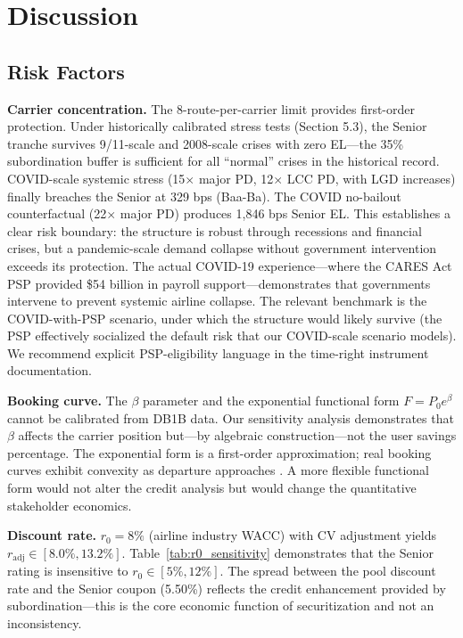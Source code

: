 \documentclass[12pt,a4paper]{article}
\begin{document}
\section{Discussion}

\subsection{Risk Factors}

\textbf{Carrier concentration.} The 8-route-per-carrier limit provides first-order protection. Under historically calibrated stress tests (Section 5.3), the Senior tranche survives 9/11-scale and 2008-scale crises with zero EL—the 35\% subordination buffer is sufficient for all ``normal'' crises in the historical record. COVID-scale systemic stress (15$\times$ major PD, 12$\times$ LCC PD, with LGD increases) finally breaches the Senior at 329 bps (Baa-Ba). The COVID no-bailout counterfactual (22$\times$ major PD) produces 1,846 bps Senior EL. This establishes a clear risk boundary: the structure is robust through recessions and financial crises, but a pandemic-scale demand collapse without government intervention exceeds its protection. The actual COVID-19 experience—where the CARES Act PSP provided \$54 billion in payroll support—demonstrates that governments intervene to prevent systemic airline collapse. The relevant benchmark is the COVID-with-PSP scenario, under which the structure would likely survive (the PSP effectively socialized the default risk that our COVID-scale scenario models). We recommend explicit PSP-eligibility language in the time-right instrument documentation.

\textbf{Booking curve.} The $\beta$ parameter and the exponential functional form $F = P_0 e^\beta$ cannot be calibrated from DB1B data. Our sensitivity analysis demonstrates that $\beta$ affects the carrier position but---by algebraic construction---not the user savings percentage. The exponential form is a first-order approximation; real booking curves exhibit convexity as departure approaches \cite{talluri2004}. A more flexible functional form would not alter the credit analysis but would change the quantitative stakeholder economics.

\textbf{Discount rate.} $r_0 = 8\%$ (airline industry WACC) with CV adjustment yields $r_{\text{adj}} \in [8.0\%, 13.2\%]$. Table~\ref{tab:r0_sensitivity} demonstrates that the Senior rating is insensitive to $r_0 \in [5\%, 12\%]$. The spread between the pool discount rate and the Senior coupon (5.50\%) reflects the credit enhancement provided by subordination---this is the core economic function of securitization and not an inconsistency.
\end{document}
